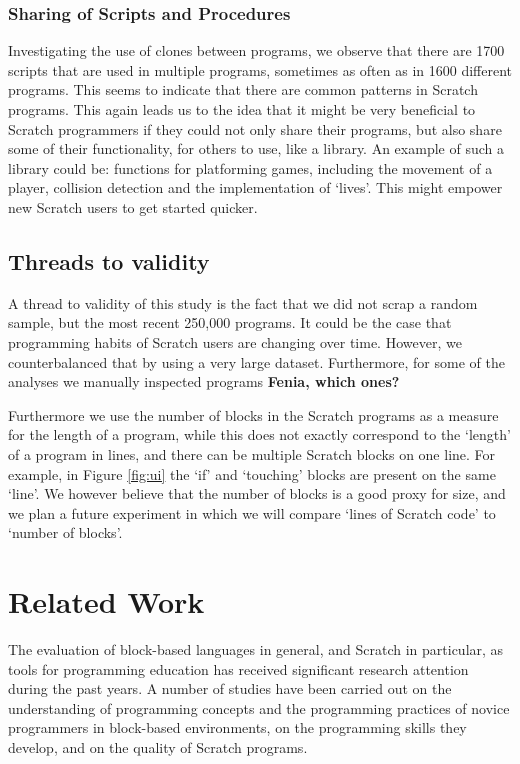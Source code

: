 \documentclass{sig-alternate}
\newcommand{\todo}[1]{\textbf{#1}}
\begin{document}
\subsubsection{Sharing of Scripts and Procedures}
Investigating the use of clones between programs, we observe that there are 1700 scripts that are used in multiple programs, sometimes as often as in 1600 different programs. This seems to indicate that there are common patterns in Scratch programs. This again leads us to the idea that it might be very beneficial to Scratch programmers if they could not only share their programs, but also share some of their functionality, for others to use, like a library. An example of such a library could be: functions for platforming games, including the movement of a player, collision detection and the implementation of `lives'. This might empower new Scratch users to get started quicker.





\subsection{Threads to validity}
A thread to validity of this study is the fact that we did not scrap a random sample, but the most recent 250,000 programs. It could be the case that programming habits of Scratch users are changing over time. However, we counterbalanced that by using a very large dataset. Furthermore, for some of the analyses we manually inspected programs \todo{Fenia, which ones?}

Furthermore we use the number of blocks in the Scratch programs as a measure for the length of a program, while this does not exactly correspond to the `length' of a program in lines, and there can be multiple Scratch blocks on one line. For example, in Figure \ref{fig:ui} the `if' and `touching' blocks are present on the same `line'. We however believe that the number of blocks is a good proxy for size, and we plan a future experiment in which we will compare `lines of Scratch code' to `number of blocks'.


\section{Related Work}
\label{sec:related}

The evaluation of block-based languages in general, and Scratch in particular, as tools for programming education has received significant research attention during the past years. A number of studies have been carried out on the understanding of programming concepts and the programming practices of novice programmers in block-based environments, on the programming skills they develop, and on the quality of Scratch programs.
\end{document}
